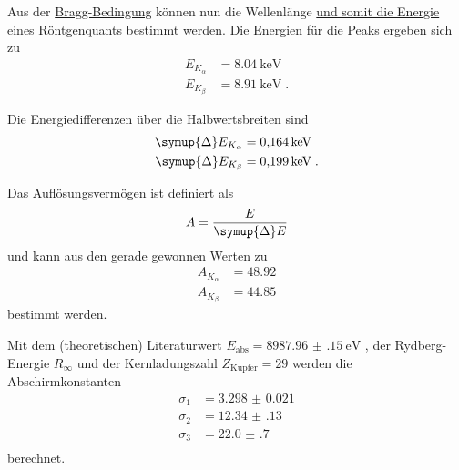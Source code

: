 Aus der \hyperref[eqn:BraggBedingung]{Bragg-Bedingung} können nun
die Wellenlänge \hyperref[eqn:lambda_to_E]{und somit die Energie} eines Röntgenquants bestimmt werden.
Die Energien für die Peaks ergeben sich zu
\begin{align*}
    E_{K_\alpha} &=  \SI{8.04}{\kilo\electronvolt} \\
    E_{K_\beta}  &=  \SI{8.91}{\kilo\electronvolt} \; .
\end{align*}

Die Energiedifferenzen über die Halbwertsbreiten sind
\begin{align*}
    \symup{\Delta}E_{K_\alpha} &= \SI{0.164}{\kilo\electronvolt} \\
    \symup{\Delta}E_{K_\beta}  &= \SI{0.199}{\kilo\electronvolt} \; .
\end{align*}


Das Auflösungsvermögen ist definiert als
\begin{equation*}
    A = \frac{E}{\symup{\Delta}E}
\end{equation*}
und kann aus den gerade gewonnen Werten zu
\begin{align*}
    A_{K_\alpha} &= \num{48.92} \\
    A_{K_\beta}  &= \num{44.85}
\end{align*}
bestimmt werden.


Mit dem (theoretischen) Literaturwert $E_\text{abs} = \SI{8987.96(15)}{\electronvolt}$ \cite{eabs},
der Rydberg-Energie $R_\infty$ und der Kernladungszahl $Z_\text{Kupfer} = 29$ werden die Abschirmkonstanten
\begin{align*}
    \sigma_1 &= \num{3.298(21)} \\ %
    \sigma_2 &= \num{12.34(13)} \\ %
    \sigma_3 &= \num{22.0(7)}   \\ %
\end{align*}
berechnet.

